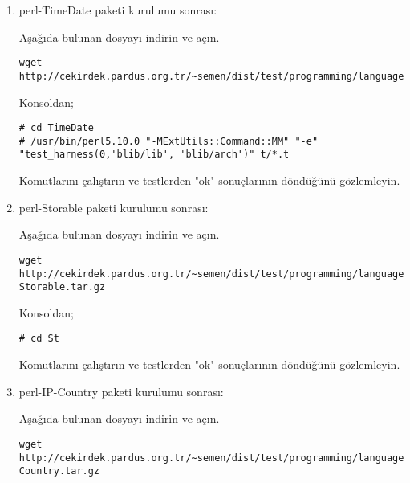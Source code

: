 \documentclass[a4paper,10pt]{article}
\begin{document}
\begin{enumerate}
\item perl-TimeDate paketi kurulumu sonrası:

Aşağıda bulunan dosyayı indirin ve açın.
\begin{verbatim}
wget http://cekirdek.pardus.org.tr/~semen/dist/test/programming/language/perl/TimeDate.tar.gz
\end{verbatim}

Konsoldan;
\begin{verbatim}
# cd TimeDate
# /usr/bin/perl5.10.0 "-MExtUtils::Command::MM" "-e" "test_harness(0,'blib/lib', 'blib/arch')" t/*.t
\end{verbatim}

Komutlarını çalıştırın ve testlerden "ok" sonuçlarının döndüğünü gözlemleyin.

\item perl-Storable paketi kurulumu sonrası:

Aşağıda bulunan dosyayı indirin ve açın.
\begin{verbatim}
wget http://cekirdek.pardus.org.tr/~semen/dist/test/programming/language/perl/
Storable.tar.gz
\end{verbatim}

Konsoldan;
\begin{verbatim}
# cd St
\end{verbatim}

Komutlarını çalıştırın ve testlerden "ok" sonuçlarının döndüğünü gözlemleyin.

% 
% 
% 

\item perl-IP-Country paketi kurulumu sonrası:

Aşağıda bulunan dosyayı indirin ve açın.
\begin{verbatim}
wget http://cekirdek.pardus.org.tr/~semen/dist/test/programming/language/perl/IP-Country.tar.gz
\end{verbatim}


\end{enumerate}
\end{document}
